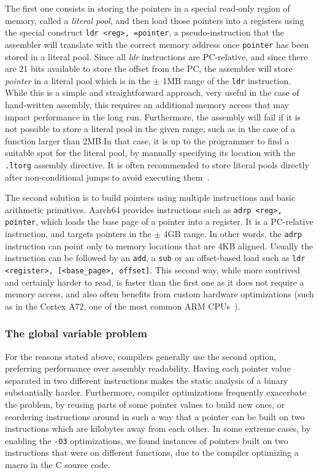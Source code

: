 \documentclass[a4paper,11pt,oneside]{report}
\begin{document}
The first one consists in storing the pointers in a special read-only region of 
memory, called a \emph{literal pool}, and then load those pointers into a 
registers using the special construct \texttt{ldr <reg>, =pointer}, a 
pseudo-instruction that the assembler will translate with the correct memory 
address once \texttt{pointer} has been stored in a literal pool.  Since all 
\emph{ldr} instructions are PC-relative, and since there are 21 bits available 
to store the offset from the PC, the assembler will store \emph{pointer} in a 
literal pool which is in the $\pm$ 1MB range of the \texttt{ldr} instruction.  
While this is a simple and straightforward approach, very useful in the case of 
hand-written assembly, this requires an additional memory access that may 
impact performance in the long run. Furthermore, the assembly will fail if it 
is not possible to store a literal pool in the given range, such as in the case 
of a function larger than 2MB.\@ In that case, it is up to the programmer to 
find a suitable spot for the literal pool, by manually specifying its location 
with the \texttt{.ltorg} assembly directive. It is often recommended to store 
literal pools directly after non-conditional jumps to avoid executing 
them~\cite{literalpools}.

The second solution is to build pointers using multiple instructions and basic 
arithmetic primitives. Aarch64 provides instructions such as \texttt{adrp 
<reg>, pointer}, which loads the base page of a pointer into a register. It is 
a PC-relative instruction, and targets pointers in the $\pm$ 4GB range.  In 
other words, the \texttt{adrp} instruction can point only to memory locations 
that are 4KB aligned. Usually the instruction can be followed by an 
\texttt{add}, a \texttt{sub} or an offset-based load such as \texttt{ldr 
<register>, [<base\_page>, offset]}. This second way, while more contrived and 
certainly harder to read, is faster than the first one as it does not require a 
memory access, and also often benefits from custom hardware optimizations (such 
as in the Cortex A72, one of the most common ARM 
CPUs~\cite{pointeroptimizations}). 

\subsubsection{The global variable problem}
For the reasons stated above, compilers generally use the second option, 
preferring performance over assembly readability. Having each pointer value 
separated in two different instructions makes the static analysis of a binary 
substantially harder. Furthermore, compiler optimizations frequently exacerbate 
the problem, by reusing parts of some pointer values to build new ones, or 
reordering instructions around in such a way that a pointer can be built on two 
instructions which are kilobytes away from each other. In some extreme cases, 
by enabling the \texttt{-O3} optimizations, we found instances of pointers 
built on two instructions that were on different functions, due to the compiler 
optimizing a macro in the C source code. 
\end{document}
